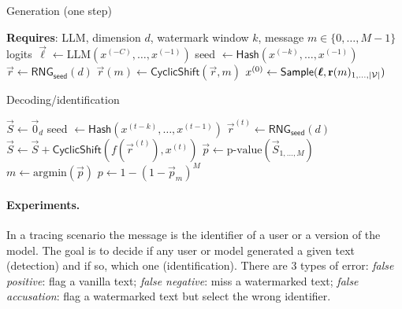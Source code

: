 \noindent
\begin{minipage}{0.48\textwidth}
    \begin{algorithm}[H] \small
    \caption{Generation (one step)}
    \label{chap5/alg:multi-bit-gen}
    \begin{algorithmic}
        \State\hspace*{-0.3cm} \textbf{Requires}: {LLM, dimension $d$, watermark window $k$, message $m\in\{0,\ldots,M-1\}$} \\
        \State logits $\vec{\boldsymbol\ell} \gets \text{LLM} \left( x^{(-C)},\dots, x^{(-1)} \right)$
        \State seed $\gets \mathsf{Hash}(x^{(-k)},\dots, x^{(-1)})$
        \State $\vec{r} \gets \mathsf{RNG_{seed}}(d)$
        \State $\vec{r}(m) \gets \mathsf{CyclicShift}(\vec{r},m)$
        \State $x^{(0)} \gets \mathsf{Sample}(\mathbf{\boldsymbol\ell},\mathbf{r}(m)_{1,\dots,|\mathcal{V}|})$
    \end{algorithmic}
\end{algorithm}
\end{minipage}\hfill
\begin{minipage}{0.48\textwidth}
    \begin{algorithm}[H] \small
    \caption{Decoding/identification}
    \label{chap5/alg:multi-bit-dec}
    \begin{algorithmic}
        \State $\vec{S} \gets \vec{0}_d$
            \State \quad seed $\gets \mathsf{Hash}(x^{(t-k)},\dots, x^{(t-1)})$
            \State \quad $\vec{r}^{(t)} \gets \mathsf{RNG_{seed}}(d)$
            \State \quad $\vec{S} \gets \vec{S} +  \mathsf{CyclicShift}(f(\vec{r}^{(t)}),x^{(t)})$
        \State $\vec{p} \gets \textrm{p-value}(\vec{S}_{1,\dots,M})$
        \State $m \gets \textrm{argmin}({\vec{p}}) $
        \State $p \gets 1 - (1 - \vec{p}_m)^M$
    \end{algorithmic}
    \end{algorithm}
\end{minipage}


\paragraph*{Experiments.} 
In a tracing scenario the message is the identifier of a user or a version of the model.
The goal is to decide if any user or model generated a given text (detection) and if so, which one (identification).
There are 3 types of error: \emph{false positive}: flag a vanilla text; \emph{false negative}: miss a watermarked text; \emph{false accusation}: flag a watermarked text but select the wrong identifier.


